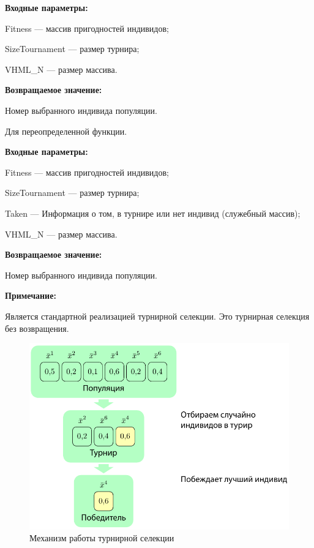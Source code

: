 \textbf{Входные параметры:}
 
 Fitness --- массив пригодностей индивидов;
 
 SizeTournament --- размер турнира;
 
 VHML\_N --- размер массива.

\textbf{Возвращаемое значение:} 

 Номер выбранного индивида популяции.

 Для переопределенной функции.
 
 \textbf{Входные параметры:}
 
 Fitness --- массив пригодностей индивидов;
 
 SizeTournament --- размер турнира;
 
 Taken --- Информация о том, в турнире или нет индивид (служебный массив);
 
 VHML\_N --- размер массива.

\textbf{Возвращаемое значение:} 

 Номер выбранного индивида популяции.
 
 \textbf{Примечание:}

 Является стандартной реализацией турнирной селекции. Это турнирная селекция без возвращения.
 
 \begin{figure} [h]
  \center
  \includegraphics [scale=0.8] {HML_TournamentSelection_Sheme}
  \caption{Механизм работы турнирной селекции} 
  \label{img:HML_TournamentSelection_Sheme}  
\end{figure}

